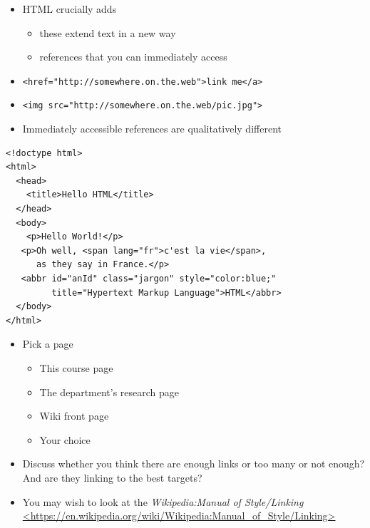 \documentclass[a4paper,landscape,headrule,footrule,xetex]{foils}
\begin{document}

\begin{itemize}
\item HTML crucially adds 
  \begin{itemize}
  \item these extend text in a new way
  \item references that you can immediately access
  \end{itemize}
\item \texttt{<href="http://somewhere.on.the.web">link me</a>}
\item \texttt{<img src="http://somewhere.on.the.web/pic.jpg">}
\item Immediately accessible references are qualitatively different
\end{itemize}

\begin{verbatim}
<!doctype html>
<html>
  <head>
    <title>Hello HTML</title>
  </head>
  <body>
    <p>Hello World!</p>
   <p>Oh well, <span lang="fr">c'est la vie</span>, 
      as they say in France.</p>
   <abbr id="anId" class="jargon" style="color:blue;" 
         title="Hypertext Markup Language">HTML</abbr>
  </body>
</html>
\end{verbatim}



\begin{itemize}
\item Pick a page
  \begin{itemize}
  \item This course page
  \item The department's research page
  \item Wiki front page
  \item Your choice
  \end{itemize}
\item Discuss whether you think there are enough links or too many or
  not enough?  And are they linking to the best targets?
\item You may wish to look at the \textit{Wikipedia:Manual of Style/Linking}
\\ \url{<https://en.wikipedia.org/wiki/Wikipedia:Manual_of_Style/Linking>}
\end{itemize}


\end{document}
